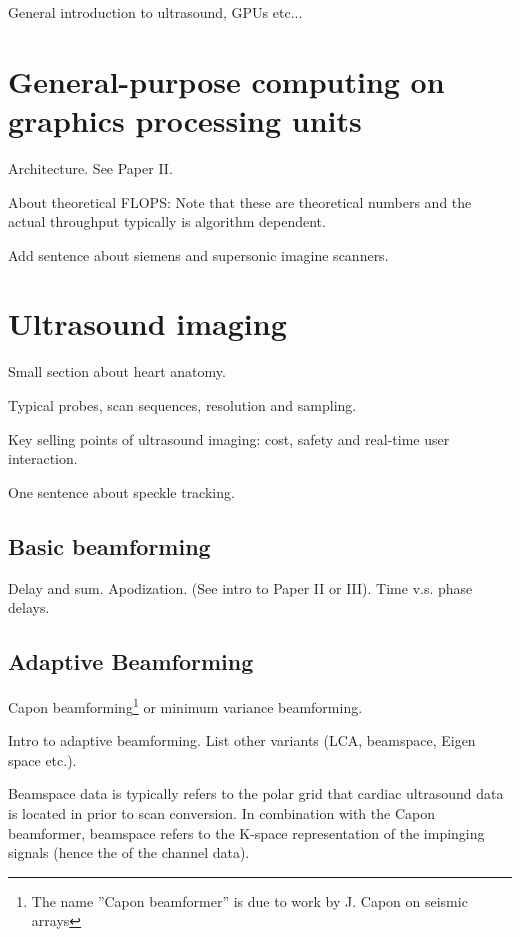 %

General introduction to ultrasound, GPUs etc...

\section{General-purpose computing on graphics processing units}

Architecture. See Paper II.

About theoretical FLOPS: Note that these are theoretical numbers and the actual throughput typically is algorithm dependent.

Add sentence about siemens and supersonic imagine scanners.

\section {Ultrasound imaging}

Small section about heart anatomy.

Typical probes, scan sequences, resolution and sampling.

Key selling points of ultrasound imaging: cost, safety and real-time user interaction.

One sentence about speckle tracking.
							
\subsection{Basic beamforming}

Delay and sum. Apodization. (See intro to Paper II or III).
Time v.s. phase delays.

\subsection{Adaptive Beamforming}\label{sec:adaptbf}

Capon beamforming\footnote{The name ''Capon beamformer'' is due to work by J. Capon  on seismic arrays } or minimum variance beamforming.

Intro to adaptive beamforming. List other variants (LCA, beamspace, Eigen space etc.). 

Beamspace data is typically refers to the polar grid that cardiac ultrasound data is located in prior to scan conversion. In combination with the Capon beamformer, beamspace refers to the K-space representation of the impinging signals (hence the  of the channel data). 

